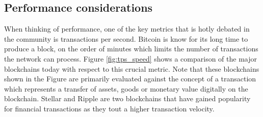 \subsection{Performance considerations}
When thinking of performance, one of the key metrics that is hotly debated in the community is transactions per second.
Bitcoin is know for its long time to produce a block, on the order of minutes which limits the number of transactions
the network can process. Figure \ref{fig:tps_speed} shows a comparison of the major blockchains today with respect to
this crucial metric. Note that these blockchains shown in the Figure are primarily evaluated against the concept of a
transaction which represents a transfer of assets, goods or monetary value digitally on the blockchain. Stellar and
Ripple are two blockchains that have gained popularity for financial transactions as they tout a higher transaction
velocity. 

